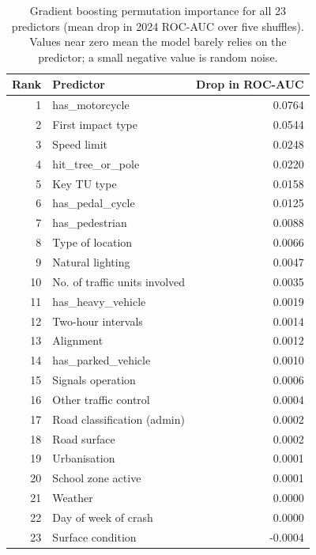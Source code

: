 \documentclass[11pt,a4paper]{article}
\begin{document}
\begin{table}[H]
\centering
\caption{Gradient boosting permutation importance for all 23 predictors (mean drop in 2024 ROC-AUC over five shuffles).
Values near zero mean the model barely relies on the predictor; a small negative value is random noise.}
\label{tab:allperm}
\footnotesize
\begin{tabular}{@{}rlr@{}}
\toprule
\textbf{Rank} & \textbf{Predictor} & \textbf{Drop in ROC-AUC} \\
\midrule
1 & has\_motorcycle & 0.0764 \\
2 & First impact type & 0.0544 \\
3 & Speed limit & 0.0248 \\
4 & hit\_tree\_or\_pole & 0.0220 \\
5 & Key TU type & 0.0158 \\
6 & has\_pedal\_cycle & 0.0125 \\
7 & has\_pedestrian & 0.0088 \\
8 & Type of location & 0.0066 \\
9 & Natural lighting & 0.0047 \\
10 & No. of traffic units involved & 0.0035 \\
11 & has\_heavy\_vehicle & 0.0019 \\
12 & Two-hour intervals & 0.0014 \\
13 & Alignment & 0.0012 \\
14 & has\_parked\_vehicle & 0.0010 \\
15 & Signals operation & 0.0006 \\
16 & Other traffic control & 0.0004 \\
17 & Road classification (admin) & 0.0002 \\
18 & Road surface & 0.0002 \\
19 & Urbanisation & 0.0001 \\
20 & School zone active & 0.0001 \\
21 & Weather & 0.0000 \\
22 & Day of week of crash & 0.0000 \\
23 & Surface condition & -0.0004 \\
\bottomrule
\end{tabular}
\end{table}
\end{document}
